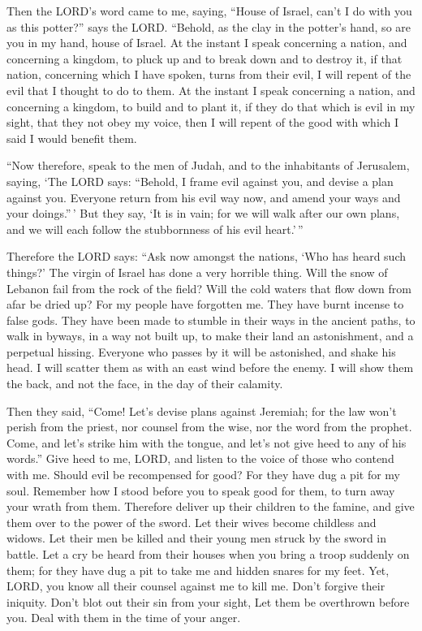  Then the LORD's word came to me, saying, 
``House of Israel, can't I do with you as this potter?'' says the LORD.
``Behold, as the clay in the potter's hand, so are you in my hand, house
of Israel.  At the instant I speak concerning a nation, and
concerning a kingdom, to pluck up and to break down and to destroy it,
 if that nation, concerning which I have spoken, turns from
their evil, I will repent of the evil that I thought to do to them.
 At the instant I speak concerning a nation, and concerning
a kingdom, to build and to plant it,  if they do that which
is evil in my sight, that they not obey my voice, then I will repent of
the good with which I said I would benefit them.

 ``Now therefore, speak to the men of Judah, and to the
inhabitants of Jerusalem, saying, `The LORD says: ``Behold, I frame evil
against you, and devise a plan against you. Everyone return from his
evil way now, and amend your ways and your doings.''\,' 
But they say, `It is in vain; for we will walk after our own plans, and
we will each follow the stubbornness of his evil heart.'\,''

 Therefore the LORD says: ``Ask now amongst the nations,
`Who has heard such things?' The virgin of Israel has done a very
horrible thing.  Will the snow of Lebanon fail from the
rock of the field? Will the cold waters that flow down from afar be
dried up?  For my people have forgotten me. They have burnt
incense to false gods. They have been made to stumble in their ways in
the ancient paths, to walk in byways, in a way not built up,
 to make their land an astonishment, and a perpetual
hissing. Everyone who passes by it will be astonished, and shake his
head.  I will scatter them as with an east wind before the
enemy. I will show them the back, and not the face, in the day of their
calamity.

 Then they said, ``Come! Let's devise plans against
Jeremiah; for the law won't perish from the priest, nor counsel from the
wise, nor the word from the prophet. Come, and let's strike him with the
tongue, and let's not give heed to any of his words.'' 
Give heed to me, LORD, and listen to the voice of those who contend with
me.  Should evil be recompensed for good? For they have dug
a pit for my soul. Remember how I stood before you to speak good for
them, to turn away your wrath from them.  Therefore deliver
up their children to the famine, and give them over to the power of the
sword. Let their wives become childless and widows. Let their men be
killed and their young men struck by the sword in battle. 
Let a cry be heard from their houses when you bring a troop suddenly on
them; for they have dug a pit to take me and hidden snares for my feet.
 Yet, LORD, you know all their counsel against me to kill
me. Don't forgive their iniquity. Don't blot out their sin from your
sight, Let them be overthrown before you. Deal with them in the time of
your anger.

